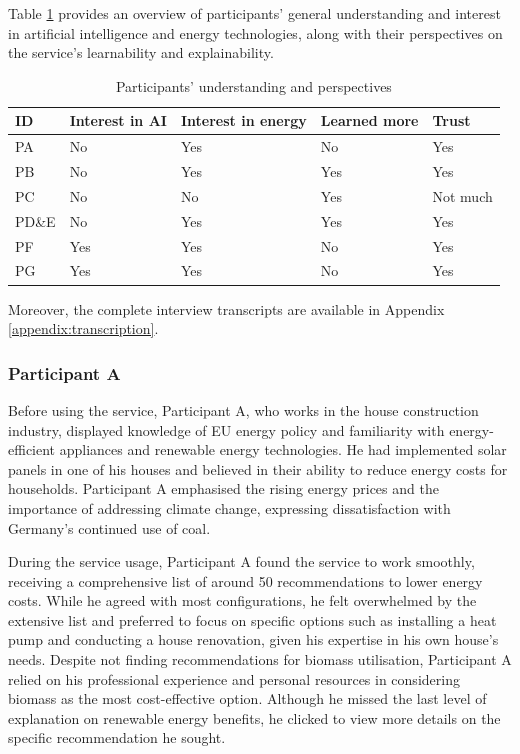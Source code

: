 Table \ref{tab:participants_perceptions} provides an overview of participants' general understanding and interest in artificial intelligence and energy technologies, 
along with their perspectives on the service's learnability and explainability. 
\begin{table}[h!]
  \centering
  \begin{tabular}{ | p{} | p{} | p{} | p{} | p{} | } 
    \hline
    ID & Interest in AI & Interest in energy & Learned more & Trust \\
    \hline
    PA & No & Yes & No & Yes \\
    \hline
    PB & No & Yes & Yes & Yes \\
    \hline
    PC & No & No & Yes & Not much \\
    \hline
    PD\&E & No & Yes & Yes & Yes \\
    \hline
    PF & Yes & Yes & No & Yes \\
    \hline
    PG & Yes & Yes & No & Yes \\
    \hline
  \end{tabular}
  \caption{Participants' understanding and perspectives}
  \label{tab:participants_perceptions}
\end{table}

Moreover, the complete interview transcripts are available in Appendix \ref{appendix:transcription}.


\subsubsection{Participant A}

Before using the service, 
Participant A, who works in the house construction industry, 
displayed knowledge of EU energy policy and familiarity with energy-efficient appliances and renewable energy technologies. 
He had implemented solar panels in one of his houses and believed in their ability to reduce energy costs for households. 
Participant A emphasised the rising energy prices and the importance of addressing climate change, expressing dissatisfaction with Germany's continued use of coal. 

During the service usage, 
Participant A found the service to work smoothly, receiving a comprehensive list of around 50 recommendations to lower energy costs. 
While he agreed with most configurations, he felt overwhelmed by the extensive list and preferred to focus on specific options such as installing a heat pump and conducting a house renovation, given his expertise in his own house's needs. 
Despite not finding recommendations for biomass utilisation, Participant A relied on his professional experience and personal resources in considering biomass as the most cost-effective option. 
Although he missed the last level of explanation on renewable energy benefits, he clicked to view more details on the specific recommendation he sought.

